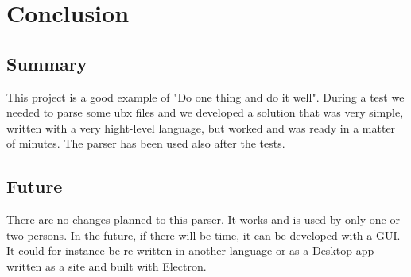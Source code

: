\section{\huge{Conclusion}}

\subsection{Summary}
This project is a good example of "Do one thing and do it well". During a test we needed to parse some ubx files and we developed a solution
that was very simple, written with a very hight-level language, but worked and was ready in a matter of minutes. The parser has been used also after the tests.

\subsection{Future}
There are no changes planned to this parser. It works and is used by only one or two persons. In the future, if there will be time, it can be
developed with a GUI. It could for instance be re-written in another language or as a Desktop app written as a site and built with Electron.